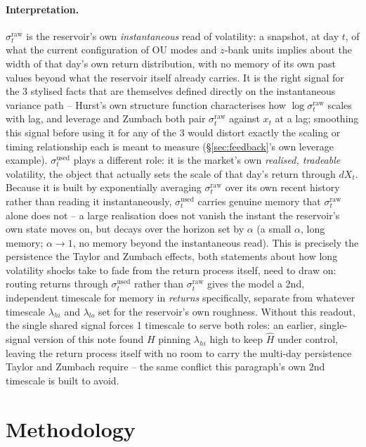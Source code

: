\documentclass[11pt]{article}
\begin{document}
\paragraph{Interpretation.} $\sigma_t^{\text{raw}}$ is the reservoir's own
\emph{instantaneous} read of volatility: a snapshot, at day $t$, of what
the current configuration of OU modes and $z$-bank units implies about
the width of that day's own return distribution, with no memory of its
own past values beyond what the reservoir itself already carries. It is
the right signal for the 3 stylised facts that are themselves defined
directly on the instantaneous variance path -- Hurst's own structure
function characterises how $\log\sigma_t^{\text{raw}}$ scales with lag,
and leverage and Zumbach both pair $\sigma_t^{\text{raw}}$ against $x_t$
at a lag; smoothing this signal before using it for any of the 3 would
distort exactly the scaling or timing relationship each is meant to
measure (\S\ref{sec:feedback}'s own leverage example). $\sigma_t^{\text{used}}$
plays a different role: it is the market's own \emph{realised, tradeable}
volatility, the object that actually sets the scale of that day's return
through $dX_t$. Because it is built by exponentially averaging
$\sigma_t^{\text{raw}}$ over its own recent history rather than reading it
instantaneously, $\sigma_t^{\text{used}}$ carries genuine memory that
$\sigma_t^{\text{raw}}$ alone does not -- a large realisation does not
vanish the instant the reservoir's own state moves on, but decays over
the horizon set by $\alpha$ (a small $\alpha$, long memory; $\alpha\to1$,
no memory beyond the instantaneous read). This is precisely the
persistence the Taylor and Zumbach effects, both statements about how
long volatility shocks take to fade from the return process itself, need
to draw on: routing returns through $\sigma_t^{\text{used}}$ rather than
$\sigma_t^{\text{raw}}$ gives the model a 2nd, independent timescale for
memory in \emph{returns} specifically, separate from whatever timescale
$\lambda_{hi}$ and $\lambda_{lo}$ set for the reservoir's own roughness.
Without this readout, the single shared signal forces 1 timescale to
serve both roles: an earlier, single-signal version of this note found
$H$ pinning $\lambda_{hi}$ high to keep $\hat H$ under control, leaving
the return process itself with no room to carry the multi-day
persistence Taylor and Zumbach require -- the same conflict this
paragraph's own 2nd timescale is built to avoid.

\section{Methodology}
\label{sec:method}
\end{document}
